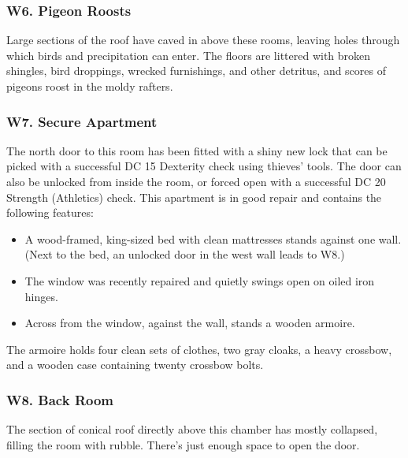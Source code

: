 \documentclass[10pt,a4paper,twoside,twocolumn,openany,nodeprecatedcode]{dndbook}
\begin{document}
\subsubsection{W6. Pigeon Roosts}
Large sections of the roof have caved in above these rooms, leaving holes through which birds and precipitation can enter. The floors are littered with broken shingles, bird droppings, wrecked furnishings, and other detritus, and scores of pigeons roost in the moldy rafters.
\subsubsection{W7. Secure Apartment}
The north door to this room has been fitted with a shiny new lock that can be picked with a successful DC 15 Dexterity check using thieves' tools. The door can also be unlocked from inside the room, or forced open with a successful DC 20 Strength (Athletics) check.
This apartment is in good repair and contains the following features:
\begin{itemize}

\item A wood-framed, king-sized bed with clean mattresses stands against one wall. (Next to the bed, an unlocked door in the west wall leads to W8.)
\item The window was recently repaired and quietly swings open on oiled iron hinges.
\item Across from the window, against the wall, stands a wooden armoire.
\end{itemize}


The armoire holds four clean sets of clothes, two gray cloaks, a heavy crossbow, and a wooden case containing twenty crossbow bolts.
\subsubsection{W8. Back Room}
The section of conical roof directly above this chamber has mostly collapsed, filling the room with rubble. There's just enough space to open the door.
\end{document}
